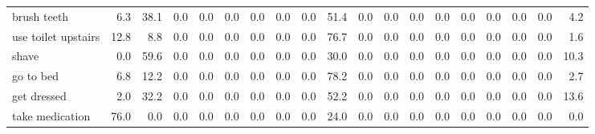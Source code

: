 \documentclass{article}
\begin{document}
\begin{sideways}
\begin{tabular}{lrrrrrrrrrrrrrrrrrr}
brush teeth                   &         6.3 &               38.1 &           0.0 &                          0.0 &                0.0 &                0.0 &                        0.0 &          0.0 &             51.4 &                0.0 &                    0.0 &                      0.0 &                  0.0 &                   0.0 &              0.0 &              0.0 &                                  0.0 &          4.2 \\
use toilet upstairs           &        12.8 &                8.8 &           0.0 &                          0.0 &                0.0 &                0.0 &                        0.0 &          0.0 &             76.7 &                0.0 &                    0.0 &                      0.0 &                  0.0 &                   0.0 &              0.0 &              0.0 &                                  0.0 &          1.6 \\
shave                         &         0.0 &               59.6 &           0.0 &                          0.0 &                0.0 &                0.0 &                        0.0 &          0.0 &             30.0 &                0.0 &                    0.0 &                      0.0 &                  0.0 &                   0.0 &              0.0 &              0.0 &                                  0.0 &         10.3 \\
go to bed                     &         6.8 &               12.2 &           0.0 &                          0.0 &                0.0 &                0.0 &                        0.0 &          0.0 &             78.2 &                0.0 &                    0.0 &                      0.0 &                  0.0 &                   0.0 &              0.0 &              0.0 &                                  0.0 &          2.7 \\
get dressed                   &         2.0 &               32.2 &           0.0 &                          0.0 &                0.0 &                0.0 &                        0.0 &          0.0 &             52.2 &                0.0 &                    0.0 &                      0.0 &                  0.0 &                   0.0 &              0.0 &              0.0 &                                  0.0 &         13.6 \\
take medication               &        76.0 &                0.0 &           0.0 &                          0.0 &                0.0 &                0.0 &                        0.0 &          0.0 &             24.0 &                0.0 &                    0.0 &                      0.0 &                  0.0 &                   0.0 &              0.0 &              0.0 &                                  0.0 &          0.0 \\

\end{tabular}
\end{sideways}
\end{document}
